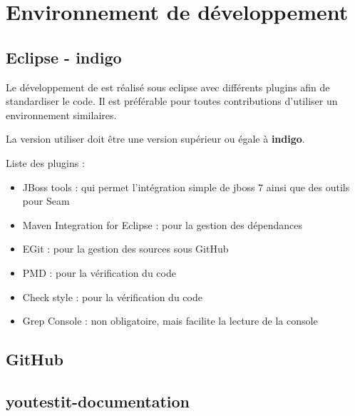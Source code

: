\newpage{}
\chapter{Environnement de développement}

\section{Eclipse - indigo}
Le développement de \youTestIt{} est réalisé sous eclipse avec différents plugins afin de standardiser 
le code. Il est préférable pour toutes contributions d'utiliser un environnement similaires.

La version utiliser doit être une version supérieur ou égale à \textbf{indigo}. 

Liste des plugins :
\begin{itemize}
	\item JBoss tools : qui permet l'intégration simple de jboss 7 ainsi que des outils pour Seam
	\item Maven Integration for Eclipse : pour la gestion des dépendances
	\item EGit : pour la gestion des sources sous GitHub
	\item PMD : pour la vérification du code
	\item Check style : pour la vérification du code
	\item Grep Console : non obligatoire, mais facilite la lecture de la console
\end{itemize}


\section{GitHub}


\section{youtestit-documentation}


